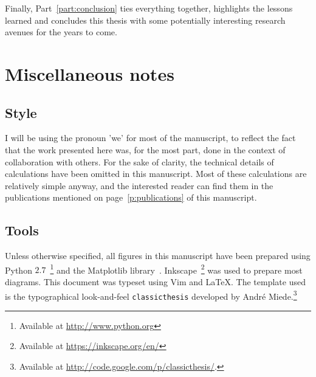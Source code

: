 Finally, Part~\ref{part:conclusion} ties everything together, highlights the lessons
learned and concludes this thesis with some potentially interesting research avenues for the
years to come.



\section{Miscellaneous notes}

\subsection{Style}
\label{sub:style}

I will be using the pronoun 'we' for most of the manuscript, to reflect the fact
that the work presented here was, for the most part, done in the context of
collaboration with others. For the sake of clarity, the technical details of
calculations have been omitted in this manuscript. Most of these calculations are
relatively simple anyway, and the interested reader can find them in the
publications mentioned on page~\ref{p:publications} of this manuscript.

\subsection{Tools}
\label{sub:tools}

Unless otherwise specified, all figures in this manuscript have been prepared
using Python $2.7$~\footnote{Available at \url{http://www.python.org}} and the
Matplotlib library~\cite{Hunter:2007}. Inkscape~\footnote{Available at
\url{https://inkscape.org/en/}} was used to prepare most diagrams. This document
was typeset using Vim and \LaTeX. The template used is the typographical look-and-feel
\texttt{classicthesis} developed by Andr\'e
Miede.\footnote{Available at 
\url{http://code.google.com/p/classicthesis/}.}

\begin{center}
\end{center}
